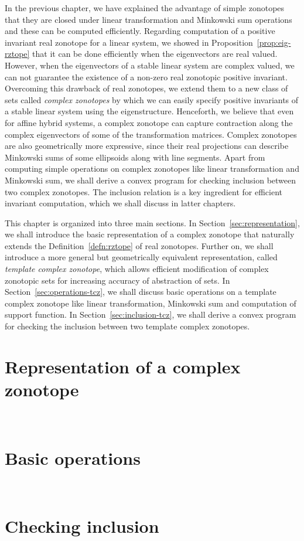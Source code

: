 
In the previous chapter, we have explained the advantage of simple
zonotopes that they are closed under linear transformation and
Minkowski sum operations and these can be computed efficiently.
Regarding computation of a positive invariant real zonotope for a
linear system, we showed in Proposition~\ref{prop:eig-rztope} that it
can be done efficiently when the eigenvectors are real valued.
However, when the eigenvectors of a stable linear system are complex
valued, we can not guarantee the existence of a non-zero real
zonotopic positive invariant.  Overcoming this drawback of real
zonotopes, we extend them to a new class of sets called \emph{complex
zonotopes} by which we can easily specify positive invariants of a
stable linear system using the eigenstructure.  Henceforth, we believe
that even for affine hybrid systems, a complex zonotope can capture
contraction along the complex eigenvectors of some of the
transformation matrices.  Complex zonotopes are also geometrically
more expressive, since their real projections can describe Minkowski
sums of some ellipsoids along with line segments.  Apart from
computing simple operations on complex zonotopes like linear
transformation and Minkowski sum, we shall derive a convex program for
checking inclusion between two complex zonotopes.  The inclusion
relation is a key ingredient for efficient invariant computation,
which we shall discuss in latter chapters.

This chapter is organized into three main sections.  In
Section~\ref{sec:representation}, we shall introduce the basic
representation of a complex zonotope that naturally extends the
Definition~\ref{defn:rztope} of real zonotopes.  Further on, we shall
introduce a more general but geometrically equivalent representation,
called \emph{template complex zonotope}, which allows efficient
modification of complex zonotopic sets for increasing accuracy of
abstraction of sets.  In Section~\ref{sec:operations-tcz}, we shall
discuss basic operations on a template complex zonotope like linear
transformation, Minkowski sum and computation of support function.  In
Section~\ref{sec:inclusion-tcz}, we shall derive a convex program for
checking the inclusion between two template complex zonotopes.  

\section{Representation of a complex zonotope}~\label{sec:representation}


\section{Basic operations}~\label{sec:operations-tcz}


\section{Checking inclusion}~\label{sec:inclusion-tcz}

